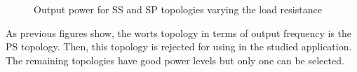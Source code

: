 \begin{figure}[htb]
\begin{center}
\begin{subfigmatrix}{2} 
\end{subfigmatrix}
\caption{Output power for SS and SP topologies varying the load resistance}
\label{F:PloadDependence}
\end{center}
\end{figure}

As previous figures show, the worts topology in terms of output frequency is the PS topology. Then, this topology is rejected for using in the studied application. The remaining topologies have good power levels but only one can be selected.

